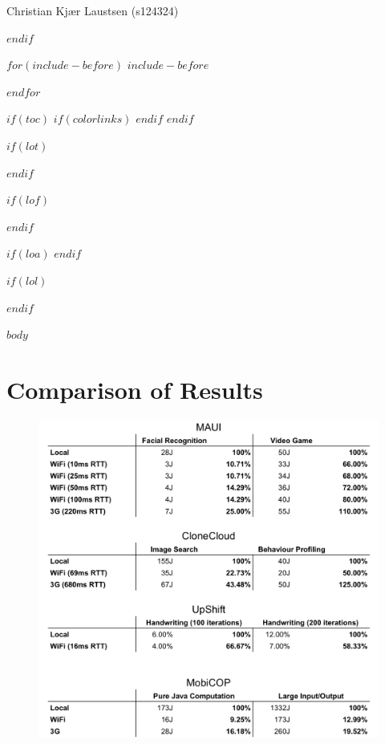 Christian Kjær Laustsen (s124324)

\clearforchapter
$endif$

$for(include-before)$
$include-before$

$endfor$

$if(toc)$
{
$if(colorlinks)$
  \hypersetup{linkcolor=$if(toccolor)$$toccolor$$else$black$endif$}
$endif$
\setcounter{tocdepth}{$toc-depth$}
\tableofcontents
}
\clearforchapter
$endif$

$if(lot)$
\listoftables
\clearforchapter
$endif$

$if(lof)$
\listoffigures
\clearforchapter
$endif$

$if(loa)$
$endif$

$if(lol)$
\listoflistings
{}
\clearforchapter
$endif$

\mainmatter
$body$

\appendix
\chapter{Comparison of Results}\label{app:comparison_of_results}

% 
\begin{figure}[h]
  \centering
  \includegraphics[page=1,width=1\textwidth]{Appendix/Comparison of Results.png}
\end{figure}

